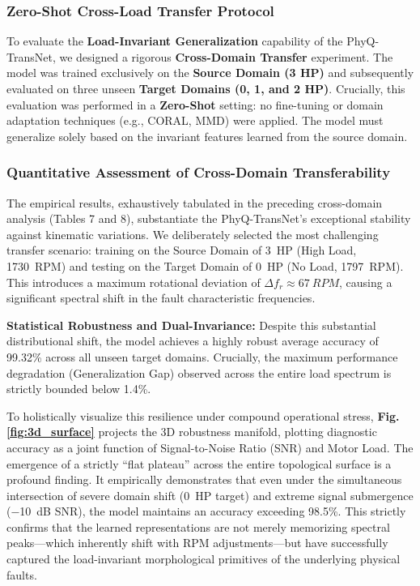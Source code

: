 \documentclass[5p,times,twocolumn]{elsarticle}
\begin{document}
\subsubsection{Zero-Shot Cross-Load Transfer Protocol}
To evaluate the \textbf{Load-Invariant Generalization} capability of the PhyQ-TransNet, we designed a rigorous \textbf{Cross-Domain Transfer} experiment. The model was trained exclusively on the \textbf{Source Domain (3 HP)} and subsequently evaluated on three unseen \textbf{Target Domains (0, 1, and 2 HP)}. Crucially, this evaluation was performed in a \textbf{Zero-Shot} setting: no fine-tuning or domain adaptation techniques (e.g., CORAL, MMD) were applied. The model must generalize solely based on the invariant features learned from the source domain.

\subsubsection{Quantitative Assessment of Cross-Domain Transferability}
The empirical results, exhaustively tabulated in the preceding cross-domain analysis (Tables 7 and 8), substantiate the PhyQ-TransNet's exceptional stability against kinematic variations. We deliberately selected the most challenging transfer scenario: training on the Source Domain of \SI{3}{HP} (High Load, \SI{1730}{RPM}) and testing on the Target Domain of \SI{0}{HP} (No Load, \SI{1797}{RPM}). This introduces a maximum rotational deviation of $\Delta f_r \approx \SI{67}{RPM}$, causing a significant spectral shift in the fault characteristic frequencies.

\textbf{Statistical Robustness and Dual-Invariance:} Despite this substantial distributional shift, the model achieves a highly robust average accuracy of 99.32\% across all unseen target domains. Crucially, the maximum performance degradation (Generalization Gap) observed across the entire load spectrum is strictly bounded below 1.4\%. 

To holistically visualize this resilience under compound operational stress, \textbf{Fig. \ref{fig:3d_surface}} projects the 3D robustness manifold, plotting diagnostic accuracy as a joint function of Signal-to-Noise Ratio (SNR) and Motor Load. The emergence of a strictly ``flat plateau'' across the entire topological surface is a profound finding. It empirically demonstrates that even under the simultaneous intersection of severe domain shift (\SI{0}{HP} target) and extreme signal submergence (\SI{-10}{dB} SNR), the model maintains an accuracy exceeding 98.5\%. This strictly confirms that the learned representations are not merely memorizing spectral peaks---which inherently shift with RPM adjustments---but have successfully captured the load-invariant morphological primitives of the underlying physical faults.
\end{document}
